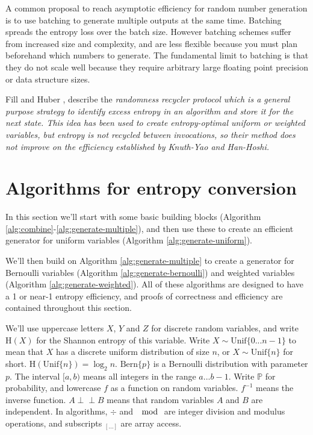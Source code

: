 \documentclass[12pt]{article}
\newcommand{\indep}{\perp\!\!\!\perp}
\newcommand{\unif}[1]{\mathrm{Unif}\{#1\}}
\newcommand{\bern}[1]{\mathrm{Bern}\{#1\}}
\newcommand{\entropy}[1]{\mathrm{H}(#1)}
\begin{document}
A common proposal to reach asymptotic efficiency for random number generation is to use batching to generate multiple outputs at the same time. \cite{bacher2017,han97,devroye86,Knuth1976TheCO,lumbroso2013optimal} Batching spreads the entropy loss over the batch size. However batching schemes suffer from increased size and complexity, and are less flexible because you must plan beforehand which numbers to generate. The fundamental limit to batching is that they do not scale well because they require arbitrary large floating point precision or data structure sizes.

Fill and Huber \cite{fill2000randomness, huber2016perfect}, describe the \em randomness recycler \em protocol which is a general purpose strategy to identify excess entropy in an algorithm and store it for the next state. This idea has been used to create entropy-optimal uniform \cite{lumbroso2013optimal, huber2024optimalrollingfairdice} or weighted \cite{huber2024optimalrollingfairdice} variables, but entropy is not recycled between invocations, so their method does not improve on the efficiency established by Knuth-Yao and Han-Hoshi.


\section{Algorithms for entropy conversion}

In this section we'll start with some basic building blocks (Algorithm \ref{alg:combine}-\ref{alg:generate-multiple}), and then use these to create an efficient generator for uniform variables (Algorithm \ref{alg:generate-uniform}).

We'll then build on Algorithm \ref{alg:generate-multiple} to create a generator for Bernoulli variables (Algorithm \ref{alg:generate-bernoulli}) and weighted variables (Algorithm \ref{alg:generate-weighted}). All of these algorithms are designed to have a 1 or near-1 entropy efficiency, and proofs of correctness and efficiency are contained throughout this section.

We'll use uppercase letters $X$, $Y$ and $Z$ for discrete random variables, and write $\entropy{X}$ for the Shannon entropy of this variable. Write $X \sim \unif{0 ... n-1}$ to mean that $X$ has a discrete uniform distribution of size $n$, or $X \sim \unif{n}$ for short. $\entropy{\unif{n}} = \log_2n$. $\bern{p}$ is a Bernoulli distribution with parameter $p$.  The interval $[a,b)$ means all integers in the range $a...b-1$. Write $\mathbb{P}$ for probability, and lowercase $f$ as a function on random variables. $f^{-1}$ means the inverse function. $A \indep B$ means that random variables $A$ and $B$ are independent. In algorithms, $\div$ and $\mod$ are integer division and modulus operations, and subscripts $_{[...]}$ are array access.
\end{document}
